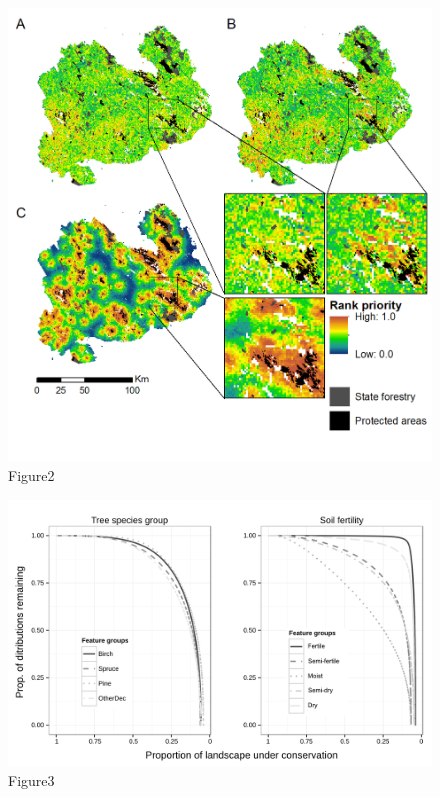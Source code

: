 \begin{figure}[htbp]
\centering
\includegraphics{figs/Fig2.png}
\caption{Figure2}
\end{figure}

\begin{figure}[htbp]
\centering
\includegraphics{figs/Fig3.png}
\caption{Figure3}
\end{figure}
